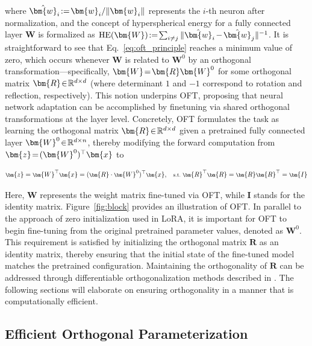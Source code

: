 where $\thickmuskip=2mu \medmuskip=2mu \hat{\bm{w}}_i:=\bm{w}_i/\|\bm{w}_i\|$ represents the $i$-th neuron after normalization, and the concept of hyperspherical energy for a fully connected layer $\bm{W}$ is formalized as $\thickmuskip=2mu \medmuskip=2mu \text{HE}(\bm{W}):= \sum_{i\neq j} \|\hat{\bm{w}}_i-\hat{\bm{w}}_j\|^{-1}$. It is straightforward to see that Eq.~\eqref{eq:oft_principle} reaches a minimum value of zero, which occurs whenever $\bm{W}$ is related to $\bm{W}^0$ by an orthogonal transformation—specifically, $\thickmuskip=2mu \medmuskip=2mu \bm{W}=\bm{R}\bm{W}^0$ for some orthogonal matrix $\thickmuskip=2mu \medmuskip=2mu \bm{R}\in\mathbb{R}^{d\times d}$ (where determinant $1$ and $-1$ correspond to rotation and reflection, respectively). This notion underpins OFT, proposing that neural network adaptation can be accomplished by finetuning via shared orthogonal transformations at the layer level. Concretely, OFT formulates the task as learning the orthogonal matrix $\thickmuskip=2mu \medmuskip=2mu \bm{R}\in\mathbb{R}^{d \times d}$ given a pretrained fully connected layer $\thickmuskip=2mu \medmuskip=2mu\bm{W}^0\in\mathbb{R}^{d\times n}$, thereby modifying the forward computation from $\thickmuskip=2mu \medmuskip=2mu\bm{z}=(\bm{W}^0)^\top\bm{x}$ to

\begin{equation}\label{eq:oft_general}
    \footnotesize
    \bm{z}=\bm{W}^\top\bm{x}=(\bm{R}\cdot\bm{W}^0)^\top\bm{x},~~~\text{s.t.}~\bm{R}^\top\bm{R}=\bm{R}\bm{R}^\top=\bm{I}
\end{equation}

Here, $\bm{W}$ represents the weight matrix fine-tuned via OFT, while $\bm{I}$ stands for the identity matrix. Figure~\ref{fig:block} provides an illustration of OFT. In parallel to the approach of zero initialization used in LoRA, it is important for OFT to begin fine-tuning from the original pretrained parameter values, denoted as $\bm{W}^0$. This requirement is satisfied by initializing the orthogonal matrix $\bm{R}$ as an identity matrix, thereby ensuring that the initial state of the fine-tuned model matches the pretrained configuration. Maintaining the orthogonality of $\bm{R}$ can be addressed through differentiable orthogonalization methods described in \cite{liu2021orthogonal,lezcano2019cheap}. The following sections will elaborate on ensuring orthogonality in a manner that is computationally efficient.

\subsection{Efficient Orthogonal Parameterization}\label{sect:eff_ortho}

